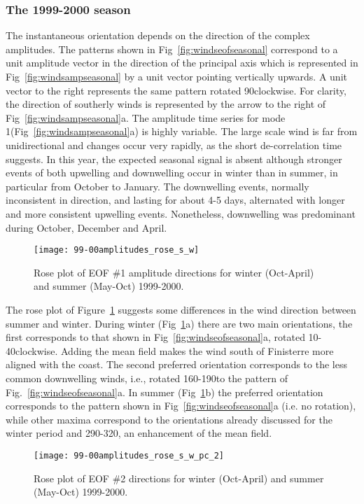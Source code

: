 \subsubsection{The 1999-2000 season}
The instantaneous orientation depends on the direction of the
complex amplitudes. The patterns shown in
Fig~\ref{fig:windseofseasonal} correspond to a unit amplitude
vector in the direction of the principal axis which is represented
in {Fig~\ref{fig:windsampseasonal}} by a unit vector pointing
vertically upwards. A unit vector to the right represents the same
pattern rotated 90\deg clockwise. For clarity, the direction of
southerly winds is represented by the arrow to the right of
Fig~\ref{fig:windsampseasonal}a. The amplitude time series for
mode 1(Fig~\ref{fig:windsampseasonal}a) is highly variable. The
large scale wind is far from unidirectional and changes occur very
rapidly, as the short de-correlation time suggests. In this year,
the expected seasonal signal is absent although stronger events of
both upwelling and downwelling occur in winter than in summer, in
particular from October to January. The downwelling events,
normally inconsistent in direction, and lasting for about 4-5
days, alternated with longer and more consistent upwelling events.
Nonetheless, downwelling was predominant during October, December
and April.
\begin{figure}
\texttt{[image: 99-00amplitudes\_rose\_s\_w]}
\caption{Rose plot of EOF \#1 amplitude directions for winter
(Oct-April) and summer (May-Oct)
1999-2000.}\label{fig:windsroseeof1}
\end{figure}
The rose plot of Figure~\ref{fig:windsroseeof1} suggests some
differences in the wind direction between summer and winter.
During winter ({Fig~\ref{fig:windsroseeof1}}a) there are two main
orientations, the first corresponds to that shown in
Fig~\ref{fig:windseofseasonal}a, rotated 10-40\deg clockwise.
Adding the mean field makes the wind south of Finisterre more
aligned with the coast. The second preferred orientation
corresponds to the less common downwelling winds, i.e., rotated
160-190\deg to the pattern of Fig.~\ref{fig:windseofseasonal}a. In
summer (Fig~\ref{fig:windsroseeof1}b) the preferred orientation
corresponds to the pattern shown in
Fig~\ref{fig:windseofseasonal}a (i.e. no rotation), while other
maxima correspond to the orientations already discussed for the
winter period and 290-320\deg, an enhancement of the mean field.
\begin{figure}[t]
\texttt{[image: 99-00amplitudes\_rose\_s\_w\_pc\_2]}
\caption{Rose plot of EOF \#2 directions for winter (Oct-April)
and summer (May-Oct) 1999-2000.}\label{fig:windsroseeof2}
\end{figure}

